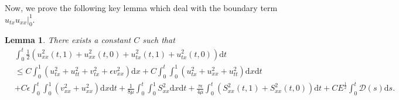 \documentclass[10pt,reqno]{amsart}
\numberwithin{equation}{section}
\newtheorem{lemma}[theorem]{Lemma}
\newcommand{\dif}{\mathrm{d}}
\begin{document}
Now, we prove the following key lemma which deal with the boundary term $u_{tx}u_{xx}\big|_0^1$. 

\begin{lemma}\label{Le3.10}
There exists a constant $C$ such that
\begin{align}
&\int_0^t \frac{1}{2} (u_{xx}^2(t,1)+u_{xx}^2(t,0)+ u_{tx}^2(t, 1)+u_{tx}^2(t, 0) ) \dif t \nonumber\\
 &\le C\int_0^1 (u_{tx}^2+u_{tt}^2+v_{tx}^2+\epsilon  v_{xx}^2 )\dif x
+C  \int_0^t\int_0^1 (u_{tx}^2+u_{xx}^2+u_{tt}^2 )\dif x \dif t \nonumber\\
&+C \epsilon \int_0^t\int_0^1 (v_{xx}^2+u_{xx}^2)\dif x \dif t +\frac{1}{8\mu} \int_0^t\int_0^1 S_{xx}^2 \dif x \dif t
+\frac{\tau \epsilon}{4\mu} \int_0^t (S_{xx}^2(t,1)+S_{xx}^2(t, 0)) \dif t +CE^\frac{1}{2}\int_0^t \mathcal D(s)\dif s .
\end{align}

\end{lemma}
\end{document}
